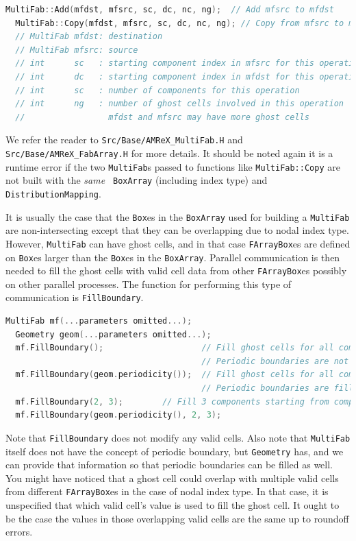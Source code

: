 {{\begin{lstlisting}[language=cpp]
  MultiFab::Add(mfdst, mfsrc, sc, dc, nc, ng);  // Add mfsrc to mfdst
  MultiFab::Copy(mfdst, mfsrc, sc, dc, nc, ng); // Copy from mfsrc to mfdst
  // MultiFab mfdst: destination 
  // MultiFab mfsrc: source
  // int      sc   : starting component index in mfsrc for this operation
  // int      dc   : starting component index in mfdst for this operation
  // int      sc   : number of components for this operation
  // int      ng   : number of ghost cells involved in this operation
  //                 mfdst and mfsrc may have more ghost cells
\end{lstlisting}
We refer the reader to {\tt Src/Base/AMReX\_MultiFab.H} and {\tt
  Src/Base/AMReX\_FabArray.H} for more details.  It should be noted
again it is a runtime error if the two {\tt MultiFab}s passed to functions
like {\tt MultiFab::Copy} are not built with the {\emph{same}} {\tt
  BoxArray} (including index type) and {\tt DistributionMapping}. 

It is usually the case that the {\tt Box}es in the {\tt BoxArray} used
for building a {\tt MultiFab} are non-intersecting except that they
can be overlapping due to nodal index type.  However, {\tt MultiFab}
can have ghost cells, and in that case {\tt FArrayBox}es are defined
on {\tt Box}es larger than the {\tt Box}es in the {\tt BoxArray}.
Parallel communication is then needed to fill the ghost cells with
valid cell data from other {\tt FArrayBox}es possibly on other
parallel processes.  The function for performing this type of
communication is {\tt FillBoundary}.
\begin{lstlisting}[language=cpp]
  MultiFab mf(...parameters omitted...);
  Geometry geom(...parameters omitted...);
  mf.FillBoundary();                    // Fill ghost cells for all components
                                        // Periodic boundaries are not filled.
  mf.FillBoundary(geom.periodicity());  // Fill ghost cells for all components
                                        // Periodic boundaries are filled.
  mf.FillBoundary(2, 3);        // Fill 3 components starting from component 2
  mf.FillBoundary(geom.periodicity(), 2, 3);
\end{lstlisting}
Note that {\tt FillBoundary} does not modify any valid cells.  Also
note that {\tt MultiFab} itself does not have the concept of
periodic boundary, but {\tt Geometry} has, and we can provide that
information so that periodic boundaries can be filled as well.  You
might have noticed that a ghost cell could overlap with multiple valid
cells from different {\tt FArrayBox}es in the case of nodal index
type.  In that case, it is unspecified that which valid cell's value
is used to fill the ghost cell.  It ought to be the case the values in
those overlapping valid cells are the same up to roundoff errors.

}}
